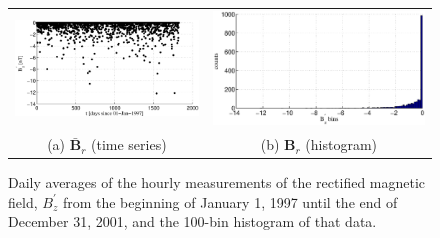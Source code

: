 \begin{figure}[ht]
\begin{tabular}{cc}
\includegraphics[scale=0.48]{SolarExample_Bzdailyrec.eps} & \includegraphics[scale=0.48]{SolarExample_Bzdailyrechist.eps} \\
(a) $\bar{\mathbf{B}}_r$ (time series) & (b) $\mathbf{\mathbf{B}}_r$ (histogram)
\end{tabular}
\caption{Daily averages of the hourly measurements of the rectified magnetic field, $B_z^\prime$ from the beginning of January 1, 1997 until the end of December 31, 2001, and the 100-bin histogram of that data.}
\label{fig:BzDstDAILYrecxyplot}
\end{figure}

